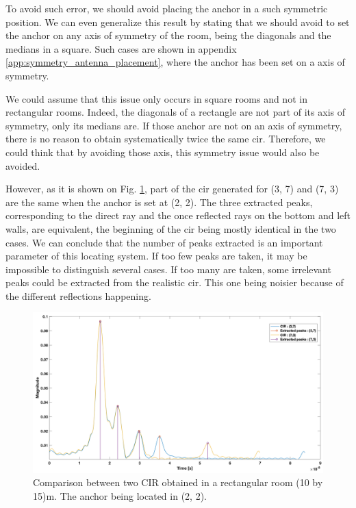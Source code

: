 To avoid such error, we should avoid placing the anchor in a such symmetric position. We can even generalize this result by stating that we should avoid to set the anchor on any axis of symmetry of the room, being the diagonals and the medians in a square. Such cases are shown in appendix \ref{app:symmetry_antenna_placement}, where the anchor has been set on a axis of symmetry.
\vspace{2mm}

We could assume that this issue only occurs in square rooms and not in rectangular rooms. Indeed, the diagonals of a rectangle are not part of its axis of symmetry, only its medians are. If those anchor are not on an axis of symmetry, there is no reason to obtain systematically twice the same \gls{cir}. Therefore, we could think that by avoiding those axis, this symmetry issue would also be avoided.
\vspace{2mm}

However, as it is shown on Fig. \ref{fig:rect_sym}, part of the \gls{cir} generated for (3, 7) and (7, 3) are the same when the anchor is set at (2, 2). The three extracted peaks, corresponding to the direct ray and the once reflected rays on the bottom and left walls, are equivalent, the beginning of the \gls{cir} being mostly identical in the two cases. We can conclude that the number of peaks extracted is an important parameter of this locating system. If too few peaks are taken, it may be impossible to distinguish several cases. If too many are taken, some irrelevant peaks could be extracted from the realistic \gls{cir}. This one being noisier because of the different reflections happening.

\begin{figure}[H]
\centering
\includegraphics[width=.8\linewidth]{Images/cir_comparison_rect.png}
\caption{Comparison between two CIR obtained in a rectangular room (10 by 15)m. The anchor being located in (2, 2). \label{fig:rect_sym}}
\end{figure}

